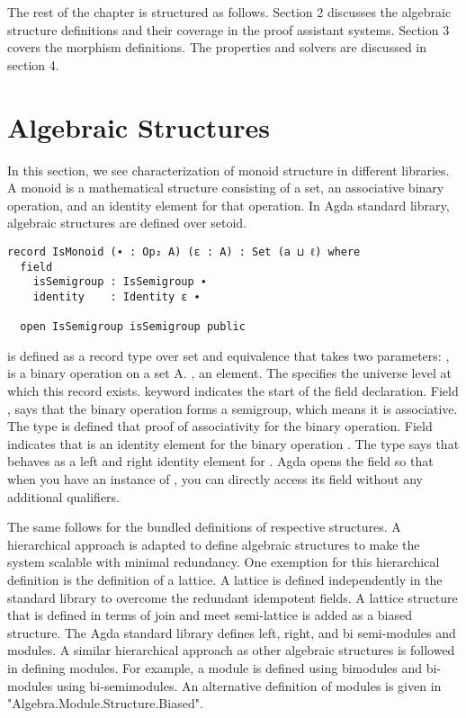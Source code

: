 The rest of the chapter is structured as follows. Section 2 discusses the
algebraic structure definitions and their coverage in the proof assistant
systems. Section 3 covers the morphism definitions. The properties and solvers
are discussed in section 4. 

\section{Algebraic Structures}
In this section, we see characterization of monoid structure in different
libraries. A monoid is a mathematical structure consisting of a set, an
associative binary operation, and an identity element for that operation. In
Agda standard library, algebraic structures are defined over setoid.

\begin{verbatim}
record IsMonoid (∙ : Op₂ A) (ε : A) : Set (a ⊔ ℓ) where
  field
    isSemigroup : IsSemigroup ∙
    identity    : Identity ε ∙

  open IsSemigroup isSemigroup public
\end{verbatim}

 is defined as a record type over set  and
equivalence  that takes two parameters: , is a binary
operation  on a set A. , an element. The  specifies the universe level at which this record exists. 
keyword indicates the start of the field declaration. Field
, says that the binary operation  forms a
semigroup, which means it is associative. The  type is
defined that proof of associativity for the binary operation. Field
 indicates that  is an identity element for the
binary operation . The  type says that 
behaves as a left and right identity element for .  Agda  opens the
 field  so that when you have an
instance of , you can directly access its 
field without any additional qualifiers.

The same follows for the bundled definitions of respective structures. A
hierarchical approach is adapted to define algebraic structures to make the
system scalable with minimal redundancy. One exemption for this hierarchical
definition is the definition of a lattice. A lattice is defined independently in
the standard library to overcome the redundant idempotent fields. A lattice
structure that is defined in terms of join and meet semi-lattice is added as a
biased structure. The Agda standard library defines left, right, and bi
semi-modules and modules. A similar hierarchical approach as other algebraic
structures is followed in defining modules. For example, a module is defined
using bimodules and bi-modules using bi-semimodules. An alternative definition
of modules is given in "Algebra.Module.Structure.Biased".

